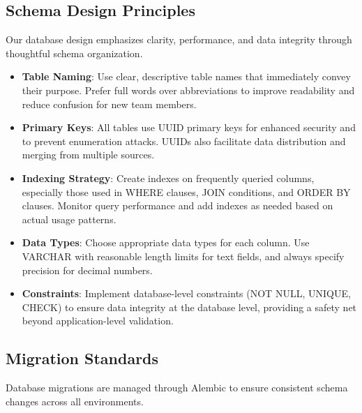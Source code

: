 \documentclass[12pt]{article}
\begin{document}
\subsection{Schema Design Principles}
Our database design emphasizes clarity, performance, and data integrity through thoughtful schema organization.

\begin{itemize}
    \item \textbf{Table Naming}: Use clear, descriptive table names that immediately convey their purpose. Prefer full words over abbreviations to improve readability and reduce confusion for new team members.
    
    \item \textbf{Primary Keys}: All tables use UUID primary keys for enhanced security and to prevent enumeration attacks. UUIDs also facilitate data distribution and merging from multiple sources.
    
    \item \textbf{Indexing Strategy}: Create indexes on frequently queried columns, especially those used in WHERE clauses, JOIN conditions, and ORDER BY clauses. Monitor query performance and add indexes as needed based on actual usage patterns.
    
    \item \textbf{Data Types}: Choose appropriate data types for each column. Use VARCHAR with reasonable length limits for text fields, and always specify precision for decimal numbers.
    
    \item \textbf{Constraints}: Implement database-level constraints (NOT NULL, UNIQUE, CHECK) to ensure data integrity at the database level, providing a safety net beyond application-level validation.
\end{itemize}

\subsection{Migration Standards}
Database migrations are managed through Alembic to ensure consistent schema changes across all environments.
\end{document}
